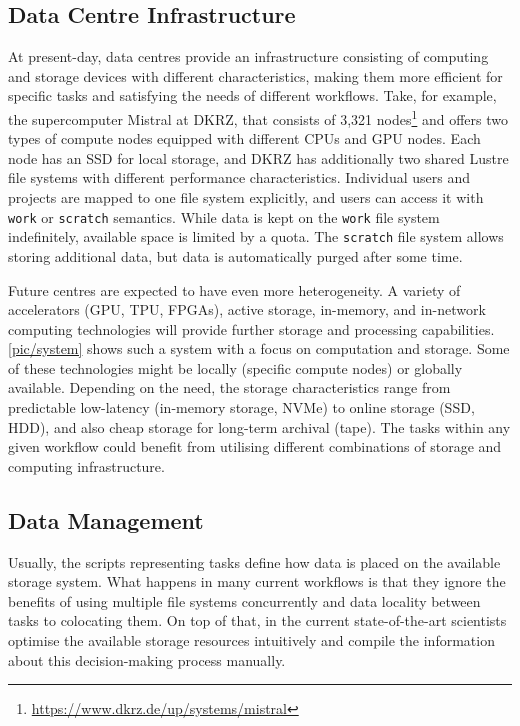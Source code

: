 \documentclass{superfri}
\begin{document}
\subsection{Data Centre Infrastructure}

At present-day, data centres provide an infrastructure consisting of computing and storage devices with different characteristics, making them more efficient for specific tasks and satisfying the needs of different workflows.
Take, for example, the supercomputer Mistral at DKRZ, that consists of 3,321 nodes\footnote{\url{https://www.dkrz.de/up/systems/mistral}} and offers two types of compute nodes equipped with different CPUs and GPU nodes.
Each node has an SSD for local storage, and DKRZ has additionally two shared Lustre file systems with different performance characteristics.
Individual users and projects are mapped to one file system explicitly, and users can access it with \texttt{work} or \texttt{scratch} semantics.
While data is kept on the \texttt{work} file system indefinitely, available space is limited by a quota.
The \texttt{scratch} file system allows storing additional data, but data is automatically purged after some time.

Future centres are expected to have even more heterogeneity. A variety of accelerators (GPU, TPU, FPGAs), active storage, in-memory, and in-network computing technologies will provide further storage and processing capabilities.
\cref{pic/system} shows such a system with a focus on computation and storage.
Some of these technologies might be locally (specific compute nodes) or globally available.
Depending on the need, the storage characteristics range from predictable low-latency (in-memory storage, NVMe) to online storage (SSD, HDD), and also cheap storage for long-term archival (tape).
The tasks within any given workflow could benefit from utilising different combinations of storage and computing infrastructure.

\subsection{Data Management}
\label{sec:datamanagement}

Usually, the scripts representing tasks define how data is placed on the available storage system.
What happens in many current workflows is that they ignore the benefits of using multiple file systems concurrently and data locality between tasks to colocating them.
On top of that, in the current state-of-the-art scientists optimise the available storage resources intuitively and compile the information about this decision-making process manually.
\end{document}
